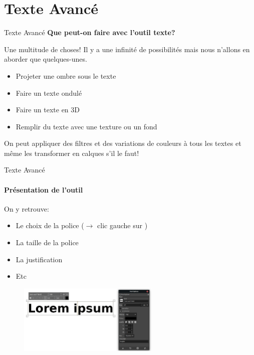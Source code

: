 \section{Texte Avancé}
	\begin{frame}{Texte Avancé}
		\textbf{Que peut-on faire avec l'outil texte?}

		Une multitude de choses! Il y a une infinité de possibilités mais nous n'allons en aborder que quelques-unes.
		\begin{itemize}
			\item Projeter une ombre sous le texte
			\item Faire un texte ondulé
			\item Faire un texte en 3D
			\item Remplir du texte avec une texture ou un fond
		\end{itemize}

		On peut appliquer des filtres et des variations de couleurs à tous les textes et même les transformer en calques s'il le faut!
	\end{frame}

\begin{frame}{Texte Avancé}
	\framesubtitle{Présentation de l'outil}

	On y retrouve:
	\begin{itemize}
	\item Le choix de la police ($\rightarrow$ clic gauche sur   )
	\item La taille de la police
	\item La justification
	\item Etc
	\end{itemize}

	\begin{figure}
		\centering
		\includegraphics[height=125px]{Images/text/text}
	\end{figure}

\end{frame}



